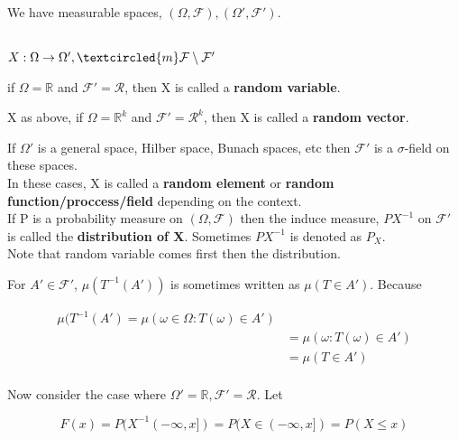 \documentclass[11pt,fleqn]{book} %
\begin{document}
We have measurable spaces, $(\Omega, \mathcal{F}), (\Omega', \mathcal{F}')$. \\\


\begin{definition}
	$X: \Omega \rightarrow \Omega', \textcircled{m} \mathcal{F}\setminus \mathcal{F}'$

if $\Omega = \mathbb{R}$ and $\mathcal{F}' = \mathcal{R}$, then X is called a \textbf{random variable}. 
\end{definition}

\begin{definition}
	X as above, if $\Omega = \mathbb{R}^k$ and $\mathcal{F}' = \mathcal{R}^k$, then X is called a \textbf{random vector}. 
\end{definition}


If $\Omega'$ is a general space, Hilber space, Bunach spaces, etc then $\mathcal{F}'$ is a $\sigma$-field on these spaces. \\

In these cases, X is called a \textbf{random element} or \textbf{random function/proccess/field} depending on the context.\\

If P is a probability measure on $(\Omega, \mathcal{F})$ then the induce measure, $P X^{-1}$ on $\mathcal{F'}$ is called the \textbf{distribution of X}. Sometimes $P X^{-1}$ is denoted as $P_X$.\\

Note that random variable comes first then the distribution. \\

					\begin{remark}
						For $A' \in \mathcal{F'}$, $\mu(T^{-1}(A')) $ is
						 sometimes written as $\mu(T \in A')$. Because 

								\begin{align*}
									\mu(T^{-1}(A') = \mu(\omega \in \Omega: T(\omega) \in A')\\
											&= \mu(\omega: T(\omega) \in A')\\
											&= \mu( T \in A')\\
								\end{align*}
					\end{remark}

Now consider the case where $\Omega' = \mathbb{R}, \mathcal{F}' = \mathcal{R}$. Let

		$$F(x) = P(X^{-1} (-\infty, x]) = P(X \in (-\infty, x]) = P(X \leq x) $$
\end{document}
